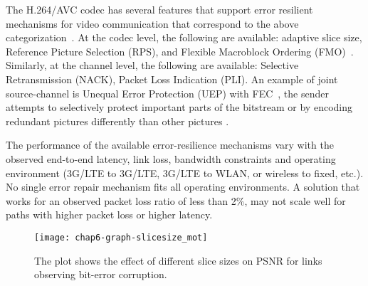 The H.264/AVC codec has several features that support error resilient
mechanisms for video communication that correspond to the above
categorization~\cite{310669}. At the codec level, the following are available:
adaptive slice size, Reference Picture Selection (RPS), and Flexible
Macroblock Ordering (FMO)~\cite{err_res_h264_std, wenger_ott_jscc}. Similarly,
at the channel level, the following are available: Selective Retransmission
(NACK), Packet Loss Indication (PLI). An example of joint source-channel is
Unequal Error Protection (UEP) with FEC~\cite{wang00review}, the sender
attempts to selectively protect important parts of the bitstream or by
encoding redundant pictures differently than other pictures \cite{ervcuupkp}.

The performance of the available error-resilience mechanisms vary with the
observed end-to-end latency, link loss, bandwidth constraints and operating
environment (3G/LTE to 3G/LTE, 3G/LTE to WLAN, or wireless to fixed, etc.). No
single error repair mechanism fits all operating environments. A solution that
works for an observed packet loss ratio of less than 2\%, may not scale well
for paths with higher packet loss or higher latency.


\begin{figure}
\centerline {
\texttt{[image: chap6-graph-slicesize\_mot]}
}
\caption{The plot shows the effect of different slice sizes on PSNR for links
observing bit-error corruption.}
\label{fig:slicesize_mot}
\end{figure}

